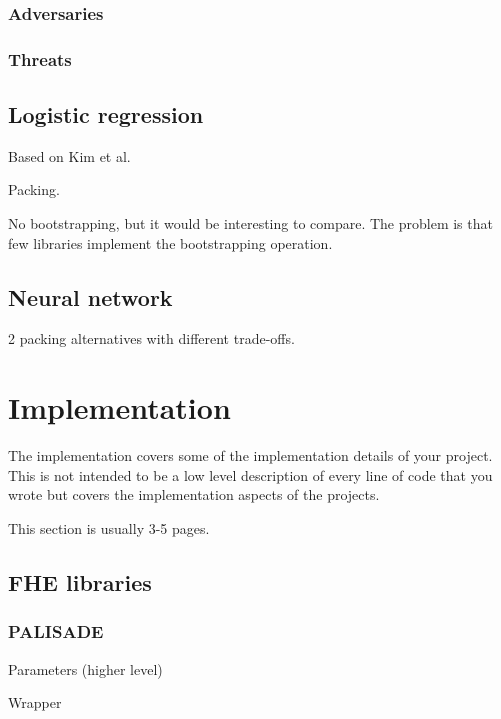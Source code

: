 \documentclass[a4paper,11pt,oneside]{report}
\begin{document}
\subsection{Adversaries}

\subsection{Threats}

\section{Logistic regression}

Based on Kim et al. ~\cite{kim_logistic_2018}

Packing.

No bootstrapping, but it would be interesting to compare. The problem is that few libraries implement the bootstrapping operation.

\section{Neural network}

2 packing alternatives with different trade-offs.



\chapter{Implementation}

The implementation covers some of the implementation details of your project.
This is not intended to be a low level description of every line of code that
you wrote but covers the implementation aspects of the projects.

This section is usually 3-5 pages.

\section{FHE libraries}

\subsection{PALISADE}

Parameters (higher level)

Wrapper
\end{document}
